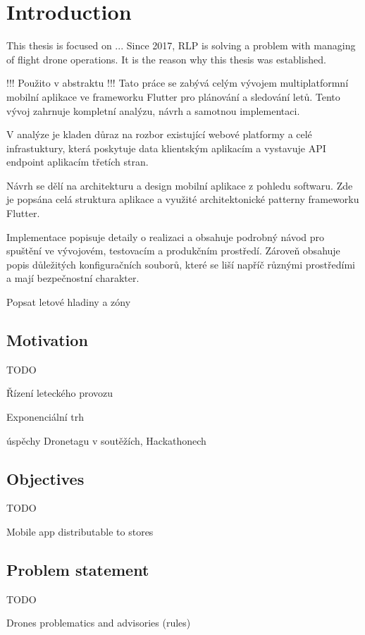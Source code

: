 \chapter{Introduction}\label{ch:introduction}
This thesis is focused on ...
Since 2017, RLP is solving a problem with managing of flight drone operations.
It is the reason why this thesis was established.

!!! Použito v abstraktu !!!
Tato práce se zabývá celým vývojem multiplatformní mobilní aplikace ve frameworku Flutter pro plánování a sledování letů.
Tento vývoj zahrnuje kompletní analýzu, návrh a samotnou implementaci.

V analýze je kladen důraz na rozbor existující webové platformy a celé infrastuktury, která poskytuje data klientským aplikacím a vystavuje API endpoint aplikacím třetích stran.

Návrh se dělí na architekturu a design mobilní aplikace z pohledu softwaru.
Zde je popsána celá struktura aplikace a využité architektonické patterny frameworku Flutter.

Implementace popisuje detaily o realizaci a obsahuje podrobný návod pro spuštění ve vývojovém, testovacím a produkčním prostředí.
Zároveň obsahuje popis důležitých konfiguračních souborů, které se liší napříč různými prostředími a mají bezpečnostní charakter.

Popsat letové hladiny a zóny

\section{Motivation}\label{sec:motivation}
TODO

Řízení leteckého provozu

Exponenciální trh

úspěchy Dronetagu v soutěžích, Hackathonech


\section{Objectives}\label{sec:objectives}
TODO

Mobile app distributable to stores

\section{Problem statement}\label{sec:problem-statement}
TODO

Drones problematics and advisories (rules)

